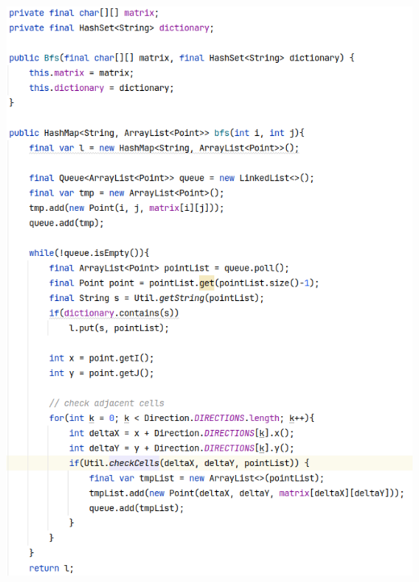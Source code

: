 \documentclass[10pt,a4paper]{article}
\begin{document}
	\includegraphics[scale=0.8]{bfs}
	\newpage
\end{document}

